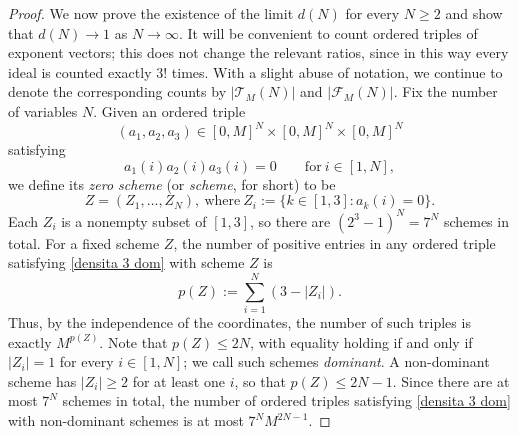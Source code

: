 \documentclass[a4paper,10pt,reqno]{amsart}
\theoremstyle{definition}
\theoremstyle{definition}
\begin{document}
\begin{proof}
We now prove the existence of the limit $d(N)$ for every $N\ge 2$ and show that $d(N)\to 1$ as $N\to\infty$. It will be convenient to count ordered triples of exponent vectors; this does not change the relevant ratios, since in this way every ideal is counted exactly $3!$ times. With a slight abuse of notation, we continue to denote the corresponding counts by $|\mathcal T_M(N)|$ and $|\mathcal F_M(N)|$. Fix the number of variables $N$. Given an ordered triple
\[(a_1,a_2,a_3)\in [0,M]^N\times [0,M]^N\times [0,M]^N\]
satisfying
\begin{equation}\label{densita 3 dom}
    a_1(i)a_2(i)a_3(i)=0\qquad\text{for}\ i\in[1,N],
\end{equation}
we define its \emph{zero scheme} (or \emph{scheme}, for short) to be
\[ Z=(Z_1,\dots,Z_N),\ \text{where}\ Z_i:=\{k\in [1,3]:a_k(i)=0\}.\]
Each $Z_i$ is a nonempty subset of $[1,3]$, so there are $(2^3-1)^N=7^N$ schemes in total. For a fixed scheme $Z$, the number of positive entries in any ordered triple satisfying \eqref{densita 3 dom} with scheme $Z$ is
\[ p(Z) := \sum_{i=1}^N(3-|Z_i|). \]
Thus, by the independence of the coordinates, the number of such triples is exactly $M^{p(Z)}$. Note  that $p(Z)\le 2N$, with equality holding if and only if $|Z_i|=1$ for every $i\in [1,N]$; we call such schemes \emph{dominant}. A non-dominant scheme has $|Z_i|\ge 2$ for at least one $i$, so that $p(Z)\le 2N-1$. Since there are at most $7^N$ schemes in total, the number of ordered triples satisfying \eqref{densita 3 dom} with non-dominant schemes is at most $7^N M^{2N-1}$.


\end{proof}
\end{document}
